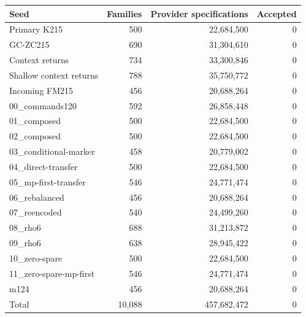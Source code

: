 \begin{center}
\begin{tabular}{@{}lrrr@{}}
\toprule
Seed & Families & Provider specifications & Accepted\\
\midrule
Primary K215 & 500 & 22,684,500 & 0\\
GC-ZC215 & 690 & 31,304,610 & 0\\
Context returns & 734 & 33,300,846 & 0\\
Shallow context returns & 788 & 35,750,772 & 0\\
Incoming FM215 & 456 & 20,688,264 & 0\\
00\_commands120 & 592 & 26,858,448 & 0\\
01\_composed & 500 & 22,684,500 & 0\\
02\_composed & 500 & 22,684,500 & 0\\
03\_conditional-marker & 458 & 20,779,002 & 0\\
04\_direct-transfer & 500 & 22,684,500 & 0\\
05\_mp-first-transfer & 546 & 24,771,474 & 0\\
06\_rebalanced & 456 & 20,688,264 & 0\\
07\_reencoded & 540 & 24,499,260 & 0\\
08\_rho6 & 688 & 31,213,872 & 0\\
09\_rho6 & 638 & 28,945,422 & 0\\
10\_zero-spare & 500 & 22,684,500 & 0\\
11\_zero-spare-mp-first & 546 & 24,771,474 & 0\\
m124 & 456 & 20,688,264 & 0\\
\midrule
Total & 10,088 & 457,682,472 & 0\\
\bottomrule
\end{tabular}
\end{center}
